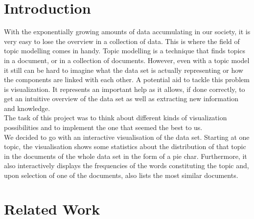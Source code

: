 \documentclass[11pt]{article}
\title{\xxx{Visualization and usage of Topic Modelling \\ \Large{(MICS2-13 -- Knowledge Discovery and Data Mining)}}}  %
\author{Keller Patrick, Meder Jeff, Olszewski Maya}    %
\date{D, Month 2018}   %
\begin{document}
\maketitle

%
\section{Introduction}
%

With the exponentially growing amounts of data accumulating in our society, it is very easy to lose the overview in a collection of data. This is where the field of topic modelling comes in handy. Topic modelling is a technique that finds topics in a document, or in a collection of documents. However, even with a topic model it still can be hard to imagine what the data set is actually representing or how the components are linked with each other. A potential aid to tackle this problem is visualization. It represents an important help as it allows, if done correctly, to get an intuitive overview of the data set as well as extracting new information and knowledge.\\
The task of this project was to think about different kinds of visualization possibilities and to implement the one that seemed the best to us.\\
We decided to go with an interactive visualisation of the data set. Starting at one topic, the visualisation shows some statistics about the distribution of that topic in the documents of the whole data set in the form of a pie char. Furthermore, it also interactively displays the frequencies of the words constituting the topic and, upon selection of one of the documents, also lists the most similar documents.

\section{Related Work}
%
\end{document}
